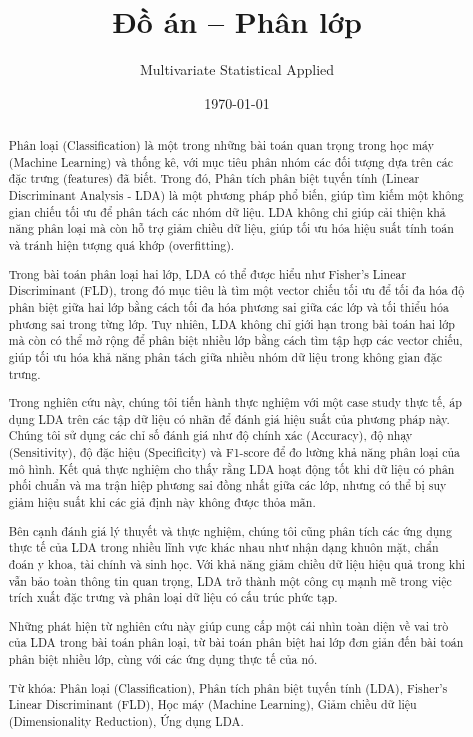 \documentclass[
  a4paper,
]{article}
\title{Đồ án -- Phân lớp}
\subtitle{Multivariate Statistical Applied}
\author{}
\date{\today}
\begin{document}
\maketitle
\begin{abstract}
Phân loại (Classification) là một trong những bài toán quan trọng trong
học máy (Machine Learning) và thống kê, với mục tiêu phân nhóm các đối
tượng dựa trên các đặc trưng (features) đã biết. Trong đó, Phân tích
phân biệt tuyến tính (Linear Discriminant Analysis - LDA) là một phương
pháp phổ biến, giúp tìm kiếm một không gian chiếu tối ưu để phân tách
các nhóm dữ liệu. LDA không chỉ giúp cải thiện khả năng phân loại mà còn
hỗ trợ giảm chiều dữ liệu, giúp tối ưu hóa hiệu suất tính toán và tránh
hiện tượng quá khớp (overfitting).

Trong bài toán phân loại hai lớp, LDA có thể được hiểu như Fisher's
Linear Discriminant (FLD), trong đó mục tiêu là tìm một vector chiếu tối
ưu để tối đa hóa độ phân biệt giữa hai lớp bằng cách tối đa hóa phương
sai giữa các lớp và tối thiểu hóa phương sai trong từng lớp. Tuy nhiên,
LDA không chỉ giới hạn trong bài toán hai lớp mà còn có thể mở rộng để
phân biệt nhiều lớp bằng cách tìm tập hợp các vector chiếu, giúp tối ưu
hóa khả năng phân tách giữa nhiều nhóm dữ liệu trong không gian đặc
trưng.

Trong nghiên cứu này, chúng tôi tiến hành thực nghiệm với một case study
thực tế, áp dụng LDA trên các tập dữ liệu có nhãn để đánh giá hiệu suất
của phương pháp này. Chúng tôi sử dụng các chỉ số đánh giá như độ chính
xác (Accuracy), độ nhạy (Sensitivity), độ đặc hiệu (Specificity) và
F1-score để đo lường khả năng phân loại của mô hình. Kết quả thực nghiệm
cho thấy rằng LDA hoạt động tốt khi dữ liệu có phân phối chuẩn và ma
trận hiệp phương sai đồng nhất giữa các lớp, nhưng có thể bị suy giảm
hiệu suất khi các giả định này không được thỏa mãn.

Bên cạnh đánh giá lý thuyết và thực nghiệm, chúng tôi cũng phân tích các
ứng dụng thực tế của LDA trong nhiều lĩnh vực khác nhau như nhận dạng
khuôn mặt, chẩn đoán y khoa, tài chính và sinh học. Với khả năng giảm
chiều dữ liệu hiệu quả trong khi vẫn bảo toàn thông tin quan trọng, LDA
trở thành một công cụ mạnh mẽ trong việc trích xuất đặc trưng và phân
loại dữ liệu có cấu trúc phức tạp.

Những phát hiện từ nghiên cứu này giúp cung cấp một cái nhìn toàn diện
về vai trò của LDA trong bài toán phân loại, từ bài toán phân biệt hai
lớp đơn giản đến bài toán phân biệt nhiều lớp, cùng với các ứng dụng
thực tế của nó.

Từ khóa: Phân loại (Classification), Phân tích phân biệt tuyến tính
(LDA), Fisher's Linear Discriminant (FLD), Học máy (Machine Learning),
Giảm chiều dữ liệu (Dimensionality Reduction), Ứng dụng LDA.
\end{abstract}
\end{document}
